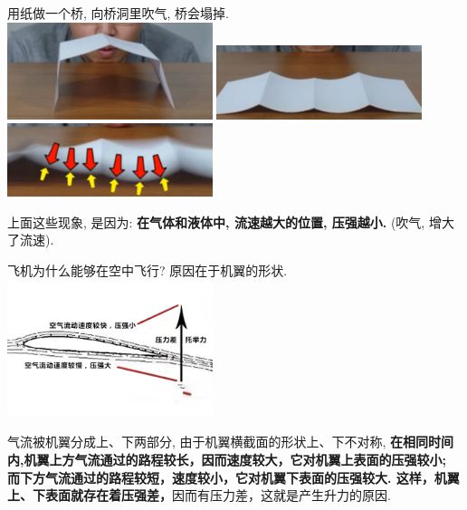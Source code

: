 \documentclass[UTF8]{ctexart}
\begin{document}
	
	\begin{tcolorbox}[title = {例},boxrule={0.1em},colframe={black!10}, colback={black!3},colbacktitle={black!10},coltitle={black}]
	用纸做一个桥, 向桥洞里吹气, 桥会塌掉. \\

\includegraphics[width=0.45\textwidth]{img/0038.png} 	
\includegraphics[width=0.45\textwidth]{img/0039.png} 
\includegraphics[width=0.45\textwidth]{img/0040.png} 
	\end{tcolorbox}


	
	上面这些现象, 是因为: \textbf{在气体和液体中, 流速越大的位置, 压强越小.} (吹气, 增大了流速).
	
	
	\begin{tcolorbox}[title = {例},boxrule={0.1em},colframe={black!10}, colback={black!3},colbacktitle={black!10},coltitle={black}]
		飞机为什么能够在空中飞行? 原因在于机翼的形状. \\
		
	\includegraphics[width=0.45\textwidth]{img/0041.png}
	
	气流被机翼分成上、下两部分, 由于机翼横截面的形状上、下不对称, \textbf{在相同时间内,机翼上方气流通过的路程较长，因而速度较大，它对机翼上表面的压强较小; 而下方气流通过的路程较短，速度较小，它对机翼下表面的压强较大. 这样，机翼上、下表面就存在着压强差，}因而有压力差，这就是产生升力的原因.			
	\end{tcolorbox}
\end{document}
